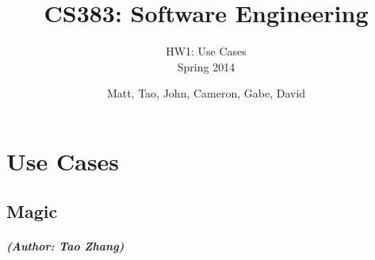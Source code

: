\documentclass[12pt,letterpaper]{scrreprt}
\title{CS383: Software Engineering}
\subtitle{HW1: Use Cases\\Spring 2014}
\author{Matt, Tao, John, Cameron, Gabe, David} %
\date{}
\begin{document}
\maketitle
\tableofcontents %


\chapter{Use Cases}

\section{Magic}
\paragraph{(Author: Tao Zhang)}
\end{document}
